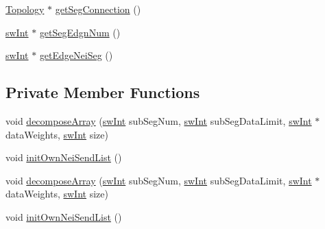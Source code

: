 \begin{DoxyCompactItemize}
\item 
\mbox{\hyperlink{classUNAT_1_1Topology}{Topology}} $\ast$ \mbox{\hyperlink{classUNAT_1_1DirectSegmentIterator_aeddd507138479b1dad08053dd342bffb}{get\+Seg\+Connection}} ()
\item 
\mbox{\hyperlink{include_2swMacro_8h_a113cf5f6b5377cdf3fac6aa4e443e9aa}{sw\+Int}} $\ast$ \mbox{\hyperlink{classUNAT_1_1DirectSegmentIterator_ac3a4d43d27e6ba2a4bf68eb22af2c0ce}{get\+Seg\+Edgn\+Num}} ()
\item 
\mbox{\hyperlink{include_2swMacro_8h_a113cf5f6b5377cdf3fac6aa4e443e9aa}{sw\+Int}} $\ast$ \mbox{\hyperlink{classUNAT_1_1DirectSegmentIterator_a6f801e4fff4b069d6b1fcc3e70073639}{get\+Edge\+Nei\+Seg}} ()
\end{DoxyCompactItemize}
\subsection*{Private Member Functions}
\begin{DoxyCompactItemize}
\item 
void \mbox{\hyperlink{classUNAT_1_1DirectSegmentIterator_abe078eae31fdecd5a4b4adf4fb96a663}{decompose\+Array}} (\mbox{\hyperlink{include_2swMacro_8h_a113cf5f6b5377cdf3fac6aa4e443e9aa}{sw\+Int}} sub\+Seg\+Num, \mbox{\hyperlink{include_2swMacro_8h_a113cf5f6b5377cdf3fac6aa4e443e9aa}{sw\+Int}} sub\+Seg\+Data\+Limit, \mbox{\hyperlink{include_2swMacro_8h_a113cf5f6b5377cdf3fac6aa4e443e9aa}{sw\+Int}} $\ast$data\+Weights, \mbox{\hyperlink{include_2swMacro_8h_a113cf5f6b5377cdf3fac6aa4e443e9aa}{sw\+Int}} size)
\item 
void \mbox{\hyperlink{classUNAT_1_1DirectSegmentIterator_a425e2615f975bf06a5915105eee718f6}{init\+Own\+Nei\+Send\+List}} ()
\item 
void \mbox{\hyperlink{classUNAT_1_1DirectSegmentIterator_abe078eae31fdecd5a4b4adf4fb96a663}{decompose\+Array}} (\mbox{\hyperlink{include_2swMacro_8h_a113cf5f6b5377cdf3fac6aa4e443e9aa}{sw\+Int}} sub\+Seg\+Num, \mbox{\hyperlink{include_2swMacro_8h_a113cf5f6b5377cdf3fac6aa4e443e9aa}{sw\+Int}} sub\+Seg\+Data\+Limit, \mbox{\hyperlink{include_2swMacro_8h_a113cf5f6b5377cdf3fac6aa4e443e9aa}{sw\+Int}} $\ast$data\+Weights, \mbox{\hyperlink{include_2swMacro_8h_a113cf5f6b5377cdf3fac6aa4e443e9aa}{sw\+Int}} size)
\item 
void \mbox{\hyperlink{classUNAT_1_1DirectSegmentIterator_a425e2615f975bf06a5915105eee718f6}{init\+Own\+Nei\+Send\+List}} ()
\end{DoxyCompactItemize}
